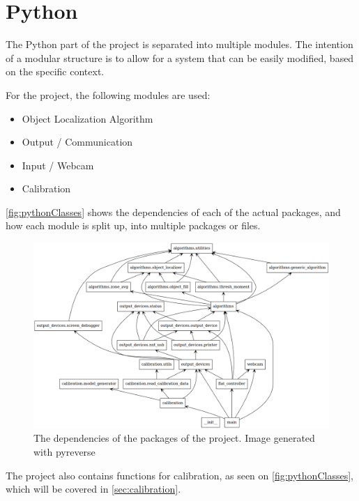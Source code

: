 \section{Python} \label{pythonstructure}
The Python part of the project is separated into multiple modules.
The intention of a modular structure is to allow for a system that can be easily modified, based on the specific context.

For the project, the following modules are used:
\begin{itemize}
	\item Object Localization Algorithm
	\item Output / Communication
	\item Input / Webcam
	\item Calibration
\end{itemize}

\autoref{fig:pythonClasses} shows the dependencies of each of the actual packages, and how each module is split up, into multiple packages or files.

\begin{figure}[H]
	\centering
	\includegraphics[width=\textwidth]{5.Solution/images/python_packages.png}
	\caption{The dependencies of the packages of the project{.} Image generated with pyreverse\cite{pyreverse}}
	\label{fig:pythonClasses}
\end{figure}


The project also contains functions for calibration, as seen on \autoref{fig:pythonClasses}, which will be covered in \autoref{sec:calibration}.

